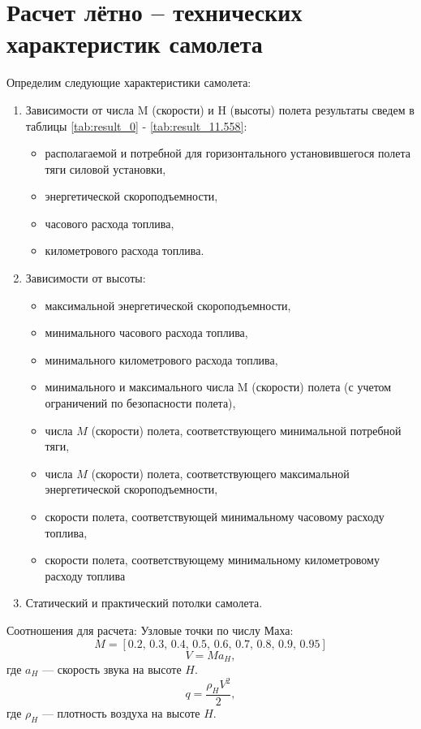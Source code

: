 \section{Расчет лётно – технических характеристик самолета}

Определим следующие характеристики самолета:
\begin{enumerate}
    \item Зависимости от числа M (скорости) и H (высоты) полета результаты
        сведем в таблицы \ref{tab:result_0} - \ref{tab:result_11.558}:
    \begin{itemize}
    \item  располагаемой и потребной для горизонтального установившегося полета
    тяги силовой установки, 
    \item энергетической скороподъемности,
    \item часового расхода топлива,
    \item километрового расхода топлива.
    \end{itemize}
    \item Зависимости от высоты:
        \begin{itemize}
            \item максимальной энергетической скороподъемности,
            \item минимального часового расхода топлива,
            \item минимального километрового расхода топлива,
            \item минимального и максимального числа M (скорости) полета (с учетом
                ограничений по безопасности полета),
            \item числа $M$ (скорости) полета, соответствующего минимальной
                потребной тяги,
            \item числа $M$ (скорости) полета, соответствующего максимальной
                энергетической скороподъемности,
            \item скорости полета, соответствующей минимальному часовому расходу топлива,
            \item скорости полета, соответствующему минимальному километровому
                расходу топлива
        \end{itemize}
    \item Статический и практический потолки самолета.
\end{enumerate}

Соотношения для расчета:
Узловые точки по числу Маха:
\[
    M = [0.2,\,0.3,\,0.4,\,0.5,\,0.6,\,0.7,\,0.8,\,0.9,\,0.95]
\]
\begin{equation}
    V = M a_H,
    \label{eq:V_speed}
\end{equation}
где $a_H$ --- скорость звука на высоте $H$.
\begin{equation}
    q = \frac{\rho_H V^2}{2},
    \label{eq:q_value}
\end{equation}
где $\rho_H$ --- плотность воздуха на высоте $H$.

